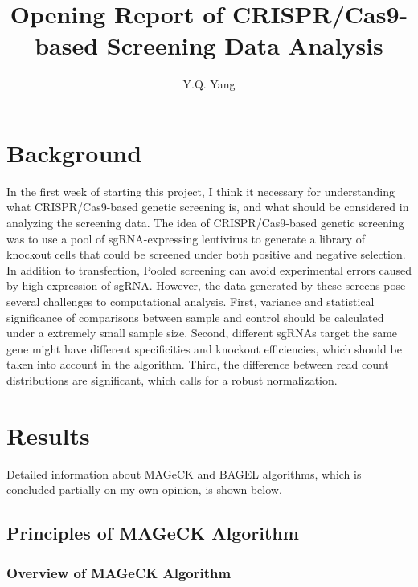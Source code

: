 \documentclass[fleqn,10pt]{wlscirep}
\title{Opening Report of CRISPR/Cas9-based Screening Data Analysis}
\author[1]{Y.Q. Yang}
\begin{document}
\flushbottom
\maketitle
%
%
\thispagestyle{empty}


\section*{Background}

In the first week of starting this project, I think it necessary for understanding what CRISPR/Cas9-based genetic screening is, and what should be considered in analyzing the screening data.  The idea of CRISPR/Cas9-based genetic screening was to use a pool of sgRNA-expressing lentivirus to generate a library of knockout cells that could be screened under both positive and negative selection. \cite{wang2014genetic} In addition to transfection, Pooled screening can avoid experimental errors caused by high expression of sgRNA.
However, the data generated by these screens pose several challenges to computational analysis. First, variance and statistical significance of comparisons between sample and control should be calculated under a extremely small sample size.  Second, different sgRNAs target the same gene might have different specificities and knockout efficiencies, which should be taken into account in the algorithm.  Third, the difference between read count distributions are significant, which calls for a robust normalization. \cite{li2014mageck}

\section*{Results}

Detailed information about MAGeCK and BAGEL algorithms, which is concluded partially on my own opinion, is shown below.

\subsection*{Principles of MAGeCK Algorithm}

\subsubsection*{Overview of MAGeCK Algorithm}
\end{document}
